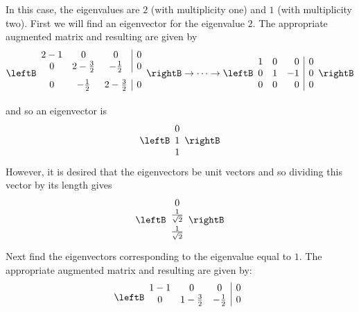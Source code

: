 \begin{solution}
In this case, the eigenvalues are $2$ (with multiplicity one) and $1$ (with multiplicity two). First
we will find an eigenvector for the eigenvalue $2$. The appropriate augmented matrix and resulting {\rref} are given by 
\begin{equation*}
\leftB
\begin{array}{ccc|c}
2-1 & 0 & 0 &  0 \\ 
0 & 2-\vspace{0.05in}\frac{3}{2} & -\vspace{0.05in}\frac{1}{2} & 0 \\ 
0 & -\vspace{0.05in}\frac{1}{2} & 2-\vspace{0.05in}\frac{3}{2} &  0
\end{array}
\rightB
\rightarrow \cdots \rightarrow
\leftB
\begin{array}{rrr|r}
1 & 0 & 0 & 0 \\ 
0 & 1 & -1 & 0 \\ 
0 & 0 & 0 & 0
\end{array}
\rightB
\end{equation*}
and so an eigenvector is 
\begin{equation*}
\leftB
\begin{array}{r}
0 \\ 
1 \\ 
1
\end{array}
\rightB 
\end{equation*}
However, it is desired that the eigenvectors be unit vectors
and so dividing this vector by its length gives 
\begin{equation*}
\leftB
\begin{array}{c}
0 \\ 
\vspace{0.05in}\frac{1}{\sqrt{2}} \\ 
\vspace{0.05in}\frac{1}{\sqrt{2}}
\end{array}
\rightB
\end{equation*}
Next find the eigenvectors corresponding to the eigenvalue equal to $1$. The appropriate augmented matrix and resulting {\rref} are given by:
\begin{equation*}
\leftB
\begin{array}{ccc|c}
1-1 & 0 & 0 & 0 \\ 
0 & 1-\vspace{0.05in}\frac{3}{2} & -\vspace{0.05in}\frac{1}{2} & 0 \\ 

\end{array}
\end{equation*}
\end{solution}
